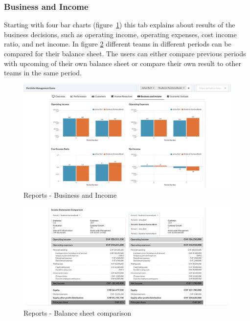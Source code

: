 \subsubsection{Business and Income}
Starting with four bar charts (figure~\ref{fig:reports_business_income}) this tab explains about results of the business decisions, such as operating income, operating expenses, cost income ratio, and net income. In figure \ref{fig:reports_balance_sheet_comparison} different teams in different periods can be compared for their balance sheet. The users can either compare previous periods with upcoming of their own balance sheet or compare their own result to other teams in the same period.
\begin{figure}[h!]
  \centering
  \includegraphics[scale=0.2]{img/application-overview/reports/05_business_income.png}
  \caption{Reports - Business and Income}
  \label{fig:reports_business_income}
\end{figure}
\begin{figure}[h!]
  \centering
  \includegraphics[scale=0.2]{img/application-overview/reports/05_business_income_balance_sheet_comparison.png}
  \caption{Reports - Balance sheet comparison}
  \label{fig:reports_balance_sheet_comparison}
\end{figure}


